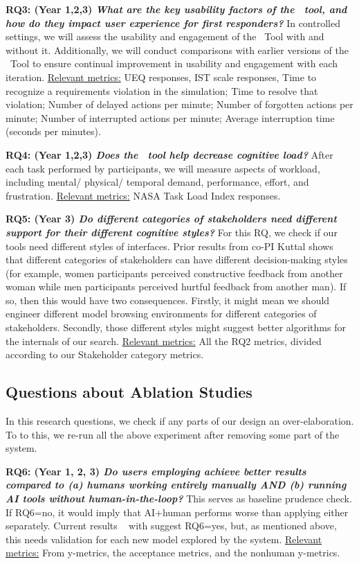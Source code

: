 {\bf RQ3: (Year 1,2,3) {\em What are the key usability factors of the \IT~tool, and how do they impact user experience for first responders?}}
In controlled settings, we will assess the usability and engagement of the \IT~Tool with and without it. Additionally, we will conduct comparisons with earlier versions of the \IT~Tool to ensure continual improvement in usability and engagement with each iteration.
\underline{Relevant metrics:} UEQ responses, IST scale responses, Time to recognize a requirements violation in the simulation; Time to resolve that violation; Number of delayed actions per minute; Number of forgotten  actions per minute; Number of interrupted actions per minute; Average interruption time (seconds per minutes).

{\bf RQ4: (Year 1,2,3) {\em Does the \IT~tool help decrease cognitive load?}}
After each task performed by participants, we will measure   aspects of workload, including mental/  physical/  temporal demand, performance, effort, and frustration.
\underline{Relevant metrics:} NASA Task Load Index responses. 

{\bf RQ5: (Year 3)  {\em Do different categories of stakeholders need different support for their different cognitive styles?}}
    For this RQ, we   check
    if our tools need different styles of interfaces.
    Prior results
    from co-PI Kuttal 
    shows that different categories of stakeholders can have different decision-making styles~\cite{Kuttal2019}
    (for example, women participants perceived constructive feedback from another woman while men participants perceived hurtful feedback from another man). If so, then this would have two consequences. Firstly,
    it might mean we should engineer different model browsing environments for different categories of stakeholders. Secondly, those different styles might suggest better algorithms for the internals of our search.   
  \underline{ Relevant metrics:} All the RQ2 metrics, divided according to our Stakeholder category metrics. 

\subsection{Questions about Ablation Studies}
In this research questions, we check if any parts of our design an over-elaboration. To to this, we re-run all the above experiment after removing some part of the system. 


{\bf RQ6: (Year 1, 2, 3) \emph{Do users employing {\IT} achieve better results compared to (a) humans working entirely manually {\bf AND} (b) running AI tools without human-in-the-loop?}}
This serves as baseline prudence check. If RQ6=no, it would imply that AI+human performs worse than applying either separately. Current results ~\cite{lustosa21,lustosa22} with {} suggest RQ6=yes, but, as mentioned above, this needs validation for each new model explored by the system.
\underline{Relevant metrics:} 
From y-metrics, the acceptance metrics, and the nonhuman y-metrics. 
 
